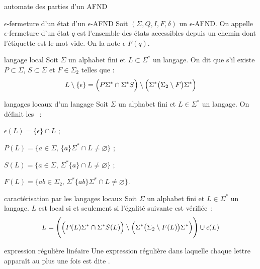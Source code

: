 \begin{adjustwidth}{-3cm}{-3cm}
\begin{definition}{2.9}{automate des parties d'un AFND}
\end{definition}

\begin{definition}{2.10}{$\epsilon$-fermeture d'un état d'un $\epsilon$-AFND}
    Soit $(\Sigma, Q, I, F, \delta)$ un $\epsilon$-AFND. On appelle $\epsilon$-fermeture d'un état $q$ est l'ensemble des états accessibles depuis un chemin dont l'étiquette est le mot vide. On la note $\epsilon$-$F(q)$.
\end{definition}

\begin{definition}{2.11}{langage local}
    Soit $\Sigma$ un alphabet fini et $L \subset \Sigma^*$ un langage. On dit que  s'il existe $P \subset \Sigma$, $S \subset \Sigma$ et $F \in \Sigma_2$ telles que :
    $$L\setminus\{\epsilon\} = \Bigl( P \Sigma^* \cap \Sigma^* S\Bigr) \setminus \Bigl( \Sigma^* \bigl( \Sigma_2 \setminus F \bigr) \Sigma^* \Bigr) $$
\end{definition} 

\begin{definition}{2.12}{langages locaux d'un langage}
    Soit $\Sigma$ un alphabet fini et $L \in \Sigma^*$ un langage. On définit les ~:
    \begin{enumeratebf}
        \item $\epsilon(L) = \{\epsilon\} \cap L$ ;
        \item $P(L) = \{a \in \Sigma,\, \{a\}\Sigma^* \cap L \neq \varnothing\}$ ;
        \item $S(L) = \{a \in \Sigma,\, \Sigma^*\{a\} \cap L \neq \varnothing\}$ ;
        \item $F(L) = \{ab \in \Sigma_2,\, \Sigma^*\{ab\}\Sigma^* \cap L \neq \varnothing\}$.
    \end{enumeratebf}
\end{definition} 

\begin{proposition}{2.13}{caractérisation par les langages locaux}
    Soit $\Sigma$ un alphabet fini et $L \in \Sigma^*$ un langage. $L$ est local si et seulement si l'égalité suivante est vérifiée~:
    $$L = \Biggl( \Bigl( P(L) \Sigma^* \cap \Sigma^* S(L)\Bigr) \setminus \Bigl( \Sigma^* \bigl( \Sigma_2 \setminus F(L) \bigr) \Sigma^* \Bigr) \Biggr) \cup \epsilon (L) $$
\end{proposition}

\begin{definition}{2.14}{expression régulière linéaire}
    Une expression régulière dans laquelle chaque lettre apparaît au plus une fois est dite .
\end{definition}


\end{adjustwidth}
